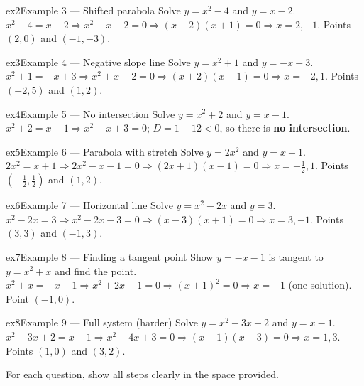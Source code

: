 \documentclass[11pt]{article}
\begin{document}
\begin{example}{ex2}{Example 3 --- Shifted parabola}
Solve $y=x^2-4$ and $y=x-2$.
\soln $x^2-4=x-2\Rightarrow x^2-x-2=0\Rightarrow (x-2)(x+1)=0\Rightarrow x=2,-1$. Points $(2,0)$ and $(-1,-3)$.
\end{example}

\begin{example}{ex3}{Example 4 --- Negative slope line}
Solve $y=x^2+1$ and $y=-x+3$.
\soln $x^2+1=-x+3\Rightarrow x^2+x-2=0\Rightarrow (x+2)(x-1)=0\Rightarrow x=-2,1$. Points $(-2,5)$ and $(1,2)$.
\end{example}

\begin{example}{ex4}{Example 5 --- No intersection}
Solve $y=x^2+2$ and $y=x-1$.
\soln $x^2+2=x-1\Rightarrow x^2-x+3=0$; $D=1-12<0$, so there is \textbf{no intersection}.
\end{example}

\begin{example}{ex5}{Example 6 --- Parabola with stretch}
Solve $y=2x^2$ and $y=x+1$.
\soln $2x^2=x+1\Rightarrow 2x^2-x-1=0\Rightarrow (2x+1)(x-1)=0\Rightarrow x=-\tfrac12,1$. Points $\left(-\tfrac12,\tfrac12\right)$ and $(1,2)$.
\end{example}

\begin{example}{ex6}{Example 7 --- Horizontal line}
Solve $y=x^2-2x$ and $y=3$.
\soln $x^2-2x=3\Rightarrow x^2-2x-3=0\Rightarrow (x-3)(x+1)=0\Rightarrow x=3,-1$. Points $(3,3)$ and $(-1,3)$.
\end{example}

\begin{example}{ex7}{Example 8 --- Finding a tangent point}
Show $y=-x-1$ is tangent to $y=x^2+x$ and find the point.
\soln $x^2+x=-x-1\Rightarrow x^2+2x+1=0\Rightarrow (x+1)^2=0\Rightarrow x=-1$ (one solution). Point $(-1,0)$.
\end{example}

\begin{example}{ex8}{Example 9 --- Full system (harder)}
Solve $y=x^2-3x+2$ and $y=x-1$.
\soln $x^2-3x+2=x-1\Rightarrow x^2-4x+3=0\Rightarrow (x-1)(x-3)=0\Rightarrow x=1,3$. Points $(1,0)$ and $(3,2)$.
\end{example}

\clearpage
{}
For each question, show all steps clearly in the space provided.
\end{document}
